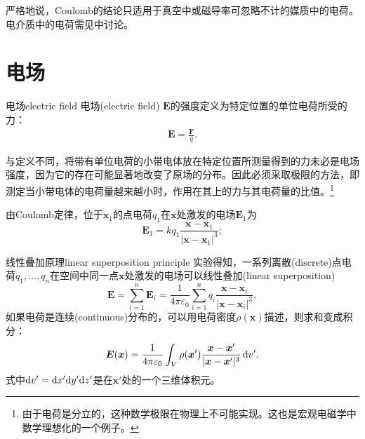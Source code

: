 严格地说，Coulomb的结论只适用于真空中或磁导率可忽略不计的媒质中的电荷。电介质中的电荷需见中讨论。

\section{电场}

\begin{definition}{电场}{electric field}
    电场(electric field) $\bm E$的强度定义为特定位置的单位电荷所受的力：
    \begin{align}
        \bm E=\frac{\bm F}q.%
    \end{align}
\end{definition}
\begin{remark}
    与定义不同，将带有单位电荷的小带电体放在特定位置所测量得到的力未必是电场强度，因为它的存在可能显著地改变了原场的分布。因此必须采取极限的方法，即测定当小带电体的电荷量越来越小时，作用在其上的力与其电荷量的比值。\footnote{由于电荷是分立的，这种数学极限在物理上不可能实现。这也是宏观电磁学中数学理想化的一个例子。}
\end{remark}

\begin{corollary}
    由Coulomb定律，位于$\bm x_1$的点电荷$q_1$在$\bm x$处激发的电场$\bm E_1$为
    \begin{equation}
        \label{eqn:E of q}
        \bm E_1=kq_1\frac{\bm x-\bm x_1}{|\bm x-\bm x_1|^3};
    \end{equation}
\end{corollary}
\begin{theorem}
    {线性叠加原理}{linear superposition principle}
    实验得知，一系列离散(discrete)点电荷$q_1,\ldots,q_n$在空间中同一点$\bm x$处激发的电场可以线性叠加(linear superposition)
    \begin{equation}
        \label{eqn:E(x) sum}
        \bm E=\sum_{i=1}^n\bm E_i=\frac1{4\pi\varepsilon_0}\sum_{i=1}^nq_i\frac{\bm x-\bm x_i}{|\bm x-\bm x_i|^3},
    \end{equation}
    如果电荷是连续(continuous)分布的，可以用电荷密度$\rho(\bm x)$描述，则求和变成积分：
    \begin{equation}
        \label{eqn:E(x)}
        \bm E(\bm x)=\frac1{4\pi\varepsilon_0}\int_V\rho(\bm x')\frac{\bm x-\bm x'}{|\bm x-\bm x'|^3}\mathop{}\!\mathrm{d} v'.
    \end{equation}
    式中$\mathop{}\!\mathrm{d} v'=\mathop{}\!\mathrm{d} x'\mathrm{d} y'\mathrm{d} z'$是在$\bm x'$处的一个三维体积元。
\end{theorem}

